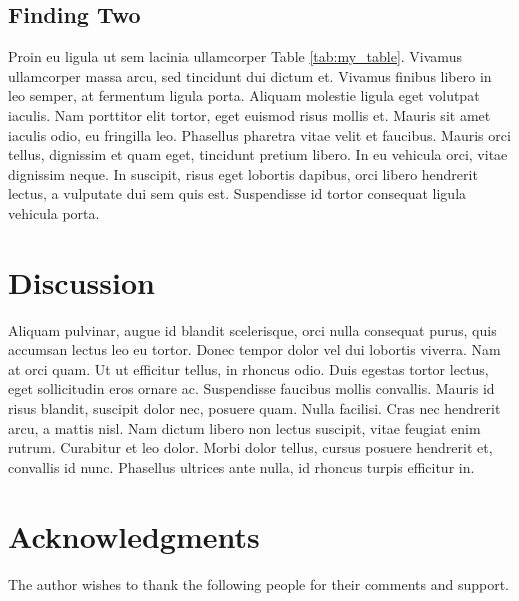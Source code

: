 \documentclass[11pt,letterpaper]{article} %
\begin{document}
	\subsection*{Finding Two}
	Proin eu ligula ut sem lacinia ullamcorper Table \ref{tab:my_table}. Vivamus ullamcorper massa arcu, sed tincidunt dui dictum et. Vivamus finibus libero in leo semper, at fermentum ligula porta. Aliquam molestie ligula eget volutpat iaculis. Nam porttitor elit tortor, eget euismod risus mollis et. Mauris sit amet iaculis odio, eu fringilla leo. Phasellus pharetra vitae velit et faucibus. Mauris orci tellus, dignissim et quam eget, tincidunt pretium libero. In eu vehicula orci, vitae dignissim neque. In suscipit, risus eget lobortis dapibus, orci libero hendrerit lectus, a vulputate dui sem quis est. Suspendisse id tortor consequat ligula vehicula porta.
	
	\section*{Discussion}
	
	Aliquam pulvinar, augue id blandit scelerisque, orci nulla consequat purus, quis accumsan lectus leo eu tortor. Donec tempor dolor vel dui lobortis viverra. Nam at orci quam. Ut ut efficitur tellus, in rhoncus odio. Duis egestas tortor lectus, eget sollicitudin eros ornare ac. Suspendisse faucibus mollis convallis. Mauris id risus blandit, suscipit dolor nec, posuere quam. Nulla facilisi. Cras nec hendrerit arcu, a mattis nisl. Nam dictum libero non lectus suscipit, vitae feugiat enim rutrum. Curabitur et leo dolor. Morbi dolor tellus, cursus posuere hendrerit et, convallis id nunc. Phasellus ultrices ante nulla, id rhoncus turpis efficitur in.
	
	\section*{Acknowledgments}
	
	The author wishes to thank the following people for their comments and support.
	
	
	\setlength{\bibsep}{0.00cm plus 0.05cm} %
	
	
	
\end{document}
